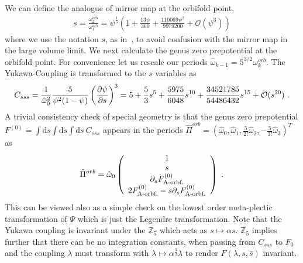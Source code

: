 \documentclass[12pt]{article}
\def\dd{\mathrm{d}}
\begin{document}
We can define the analogue of mirror map at the orbifold point,
\begin{eqnarray}
s=\frac{\omega_2^{orb}}{\omega^{orb}_1}=\psi^{\frac{1}{5}}(1+\frac{13\psi}{360}+\frac{110069\psi^{2}}{9979200}
+\mathcal{O}(\psi^{3}))
\end{eqnarray}
where  we use the notation $s$, as in~\cite{Aganagic:2006wq}, to
avoid confusion with the mirror map in the large volume limit. We
next calculate the genus zero prepotential at the orbifold point.
For convenience let us rescale our periods $\hat \omega_{k-1}=
5^{3/2} \omega^{orb}_{k}$. The Yukawa-Coupling is transformed to
the $s$ variables as
\begin{equation}
C_{sss}=\frac{1}{\hat \omega_0^2}
\frac{5}{\psi^2(1-\psi)} \left(\frac{\partial \psi}{\partial s}\right)^3=
5 +\frac{5}{3} s^5 +\frac{5975}{6048} s^{10}+\frac{34521785}{54486432} s^{15}+{\cal O}(s^{20})  \ .
\end{equation}
A trivial consistency check of special geometry is that the genus
zero prepotential $F^{(0)}=\int \dd s \int \dd s \int \dd s \
C_{sss}$ appears in the periods $\hat \Pi^{orb}=( \hat
\omega_0,\hat \omega_1,\frac{5}{2!} \hat \omega_2,-\frac{5}{3!}
\hat \omega_3)^T$ as
\begin{equation}
\hat \Pi^{orb}=\hat \omega_0 \left(\begin{array}{c}
1\cr
s\cr
\partial_s F_{\textrm{A-orbf.}}^{(0)}\cr
2 F_{\textrm{A-orbf.}}^{(0)}- s\partial_s F_{\textrm{A-orbf.}}^{(0)}
\end{array}
\right)\ .
\end{equation}
This can be viewed also as a simple check on the lowest order 
meta-plectic transformation of $\Psi$ which is just the Legendre 
transformation. Note that the Yukawa coupling is 
invariant under the $\mathbb{Z}_5$ which acts as
$s\mapsto \alpha s$. $\mathbb{Z}_5$ implies further that there can be no
integration constants, when passing from $C_{sss}$ to $F_0$ and the coupling
$\lambda$ must transform with $\lambda \mapsto \alpha^\frac{3}{2} \lambda$ to
render $F(\lambda,s,\bar s)$ invariant.
\end{document}
